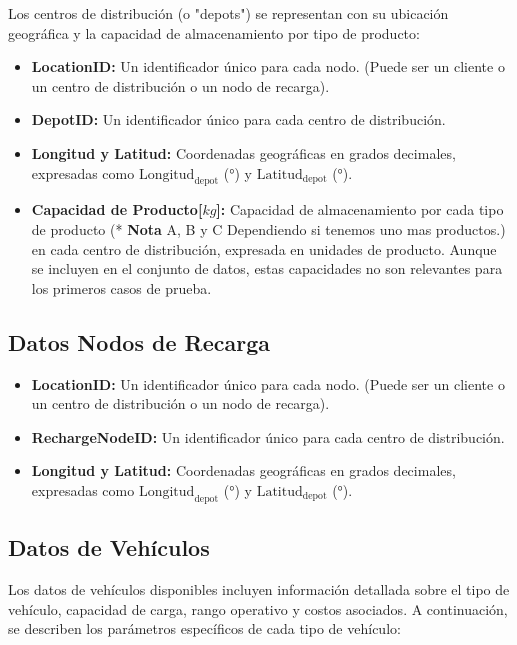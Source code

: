 \documentclass[12pt]{article}
\begin{document}
Los centros de distribución (o "depots") se representan con su ubicación geográfica y la capacidad de almacenamiento por tipo de producto:
\begin{itemize}
    \item \textbf{LocationID:} Un identificador único para cada nodo. (Puede ser un cliente o un centro de distribución o un nodo de recarga).
    \item \textbf{DepotID:} Un identificador único para cada centro de distribución.
    \item \textbf{Longitud y Latitud:} Coordenadas geográficas en grados decimales, expresadas como $\text{Longitud}_{\text{depot}}$ (°) y $\text{Latitud}_{\text{depot}}$ (°).
    \item \textbf{Capacidad de Producto[$kg$]:} Capacidad de almacenamiento por cada tipo de producto (* \textbf{Nota} A, B y C Dependiendo si tenemos uno mas productos.) en cada centro de distribución, expresada en unidades de producto. Aunque se incluyen en el conjunto de datos, estas capacidades no son relevantes para los primeros casos de prueba.
\end{itemize}

\subsection{Datos Nodos de Recarga}
\begin{itemize}
    \item \textbf{LocationID:} Un identificador único para cada nodo. (Puede ser un cliente o un centro de distribución o un nodo de recarga).
    \item \textbf{RechargeNodeID:} Un identificador único para cada centro de distribución.
    \item \textbf{Longitud y Latitud:} Coordenadas geográficas en grados decimales, expresadas como $\text{Longitud}_{\text{depot}}$ (°) y $\text{Latitud}_{\text{depot}}$ (°).
\end{itemize}

\subsection{Datos de Vehículos}

Los datos de vehículos disponibles incluyen información detallada sobre el tipo de vehículo, capacidad de carga, rango operativo y costos asociados. A continuación, se describen los parámetros específicos de cada tipo de vehículo:
\end{document}
